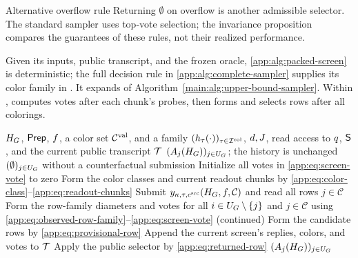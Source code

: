 \begin{proposalcontext}{Alternative overflow rule}
Returning $\emptyset$ on overflow is another admissible selector.
The standard sampler uses top-vote selection; the invariance proposition
compares the guarantees of these rules, not their realized performance.
\end{proposalcontext}

Given its inputs, public transcript, and the frozen oracle,
\cref{app:alg:packed-screen} is deterministic; the full decision rule in \cref{app:alg:complete-sampler}
supplies its color family in .
It expands  of
Algorithm~\ref{main:alg:upper-bound-sampler}.
Within ,  computes votes
after each chunk's probes, then forms and selects rows after all colorings.

\begin{algorithm}[H]
\caption{Packed color screen with a fixed draft}
\label{app:alg:packed-screen}
\label{main:alg:packed-screen}
\begin{algorithmic}[1]
\Require $H_{G}$, $\mathsf{Prep}$, $f$, a color set $\mathcal C^{\mathrm{val}}$, and a family
  $(h_{\tau}(\cdot))_{\tau\in\mathcal I^{\mathrm{col}}}$,
  $d,J$, read access to $q$,
  $\mathsf S$, and the current public transcript $\mathcal T$
\Ensure $(A_{j}(H_{G}))_{j\in U_{G}}$; the history is unchanged
  \State \Return $(\emptyset)_{j\in U_{G}}$ without a counterfactual submission
\EndIf
\State Initialize all votes in \ref{app:eq:screen-vote} to zero
\For{$\tau\in\ColoringIndexSet$}
  \Statex {}
  \State Form the color classes and current readout chunks by
    \ref{app:eq:color-class}--\ref{app:eq:readout-chunks}
    \Statex {}
    \For{$\kappa\in\ScreenColumnSet$}
      \For{$\SourceColorValue\in
             \ColorSet\setminus\{\ReadoutColorValue\}$}
        \State Submit $y_{\kappa,\tau,c^{\mathrm{src}}}(H_{G},f,\mathcal C)$
          and read all rows $j\in \mathcal C$
      \EndFor
    \EndFor
    \Statex {}
    \State Form the row-family diameters and votes for all
      $i\in U_{G}\setminus\{j\}$ and $j\in \mathcal C$ using
      \ref{app:eq:observed-row-family}--\ref{app:eq:screen-vote}
  \EndFor
\EndFor
\Statex {} (continued)
\State Form the candidate rows by \ref{app:eq:provisional-row}
\State Append the current screen's replies, colors, and votes to $\mathcal T$
\State Apply the public selector by \ref{app:eq:returned-row}
\State \Return $(A_{j}(H_{G}))_{j\in U_{G}}$
\end{algorithmic}
\end{algorithm}

